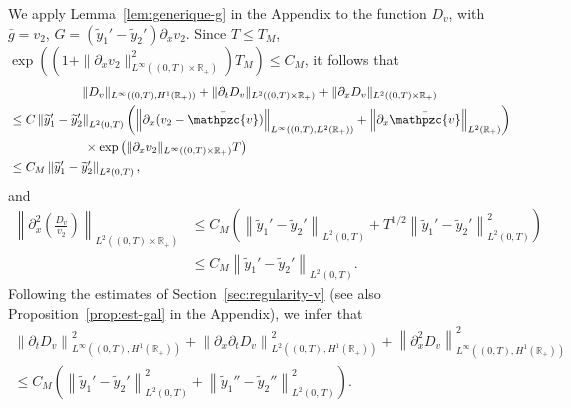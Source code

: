 \documentclass[AHL,Unicode,longabstracts,published]{cedram}
\newcommand{\R}{\mathbb{R}}
\newcommand{\p}{\partial}
\newcommand{\bv}{\bar{\mathpzc{v}}}
\newcommand{\ty}{\widetilde{y}}
\newcommand{\dv}{D_v}
\begin{document}
We apply Lemma~\ref{lem:generique-g} in the Appendix to the function $\dv$, with $\bar g=v_2$, $G= (\ty_1'-\ty_2')\p_x v_2$. Since $T\leq T_M$, $\exp((1+\|\p_x v_2\|_{L^\infty((0,T)\times \R_+)}^2) T_M)\leq C_M$, it follows that
\begin{multline*}
\|\dv\|_{L^\infty\left((0,T), H^1(\R_+)\right)} + \|\p_t \dv\|_{L^2\left((0,T)\times \R_+\right)} + \|\p_x \dv\|_{L^2((0,T)\times \R_+)} \\
\begin{aligned}
&\leq C\left\|\ty_1'-\ty_2'\right\|_{L^2(0,T)}\left(\left\|\p_x (v_2 - \bv)\right\|_{L^\infty\left((0,T), L^2(\R_+)\right)} + \left\|\p_x \bv\right\|_{L^2(\R_+)} \right)\\
&\qquad\qquad\qquad\times
\exp\left(\|\p_x v_2\|_{L^\infty((0,T)\times \R_+)} T\right)\\
&\leq C_M \left\|\ty_1'-\ty_2'\right\|_{L^2(0,T)},
\end{aligned}
\end{multline*}
and
\begin{align*}
\left\| \p_x^2 \left(\frac{\dv}{v_2}\right)\right\|_{L^2\left((0,T)\times \R_+\right)} & \leq C_M \left(\left\|\ty_1'-\ty_2'\right\|_{L^2(0,T)} + T^{1/2}\left\|\ty_1'-\ty_2'\right\|_{L^2(0,T)}^2\right)
\\
&\leq C_M \left\|\ty_1'-\ty_2'\right\|_{L^2(0,T)}.
\end{align*}
Following the estimates of Section~\ref{sec:regularity-v} (see also Proposition~\ref{prop:est-gal} in the Appendix), we infer that
\begin{multline*}
\left\|\p_t \dv \right\|_{L^\infty\left((0,T), H^1(\R_+)\right)}^2 + \left\|\p_x \p_t \dv\right\|_{L^2\left((0,T), H^1(\R_+)\right)}^2 + \left\|\p_x^2 \dv\right\|_{L^\infty\left((0,T), H^1(\R_+)\right)}^2\\
\leq C_M \left(\left\|\ty_1'-\ty_2'\right\|_{L^2(0,T)}^2 + \left\|\ty_1''-\ty_2''\right\|_{L^2(0,T)}^2\right).
\end{multline*}
\end{document}
